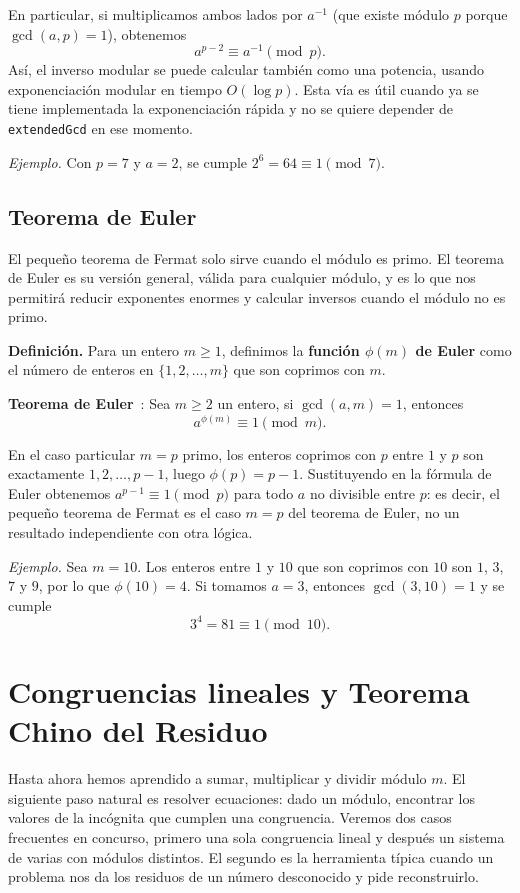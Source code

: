 En particular, si multiplicamos ambos lados por $a^{-1}$ (que existe módulo $p$ porque $\gcd(a,p)=1$), obtenemos
\[
a^{p-2} \equiv a^{-1} \pmod{p}.
\]
Así, el inverso modular se puede calcular también como una potencia, usando exponenciación modular en tiempo $O(\log p)$. Esta vía es útil cuando ya se tiene implementada la exponenciación rápida y no se quiere depender de \texttt{extendedGcd} en ese momento.

\textit{Ejemplo.} Con $p = 7$ y $a = 2$, se cumple $2^6 = 64 \equiv 1 \pmod{7}$.


\subsection*{Teorema de Euler}

El pequeño teorema de Fermat solo sirve cuando el módulo es primo. El teorema de Euler es su versión general, válida para cualquier módulo, y es lo que nos permitirá reducir exponentes enormes y calcular inversos cuando el módulo no es primo.

\textbf{Definición.} Para un entero $m\geq 1$, definimos la \textbf{función $\phi(m)$ de Euler} como el número de enteros en $\{1,2,\dots,m\}$ que son coprimos con $m$.

\textbf{Teorema de Euler}~\cite{perez_numeros}: Sea $m \ge 2$ un entero, si $\gcd(a,m)=1$, entonces
\[
a^{\phi(m)} \equiv 1 \pmod{m}.
\]

En el caso particular $m = p$ primo, los enteros coprimos con $p$ entre $1$ y $p$ son exactamente $1,2,\ldots,p-1$, luego $\phi(p) = p-1$. Sustituyendo en la fórmula de Euler obtenemos $a^{p-1} \equiv 1 \pmod{p}$ para todo $a$ no divisible entre $p$: es decir, el pequeño teorema de Fermat es el caso $m = p$ del teorema de Euler, no un resultado independiente con otra lógica.

\textit{Ejemplo.} Sea $m = 10$. Los enteros entre $1$ y $10$ que son coprimos con $10$ son $1$, $3$, $7$ y $9$, por lo que $\phi(10) = 4$. Si tomamos $a = 3$, entonces $\gcd(3,10)=1$ y se cumple
\[
3^4 = 81 \equiv 1 \pmod{10}.
\]
\section{Congruencias lineales y Teorema Chino del Residuo}

Hasta ahora hemos aprendido a sumar, multiplicar y dividir módulo $m$. El siguiente paso natural es resolver ecuaciones: dado un módulo, encontrar los valores de la incógnita que cumplen una congruencia. Veremos dos casos frecuentes en concurso, primero una sola congruencia lineal y después un sistema de varias con módulos distintos. El segundo es la herramienta típica cuando un problema nos da los residuos de un número desconocido y pide reconstruirlo.

